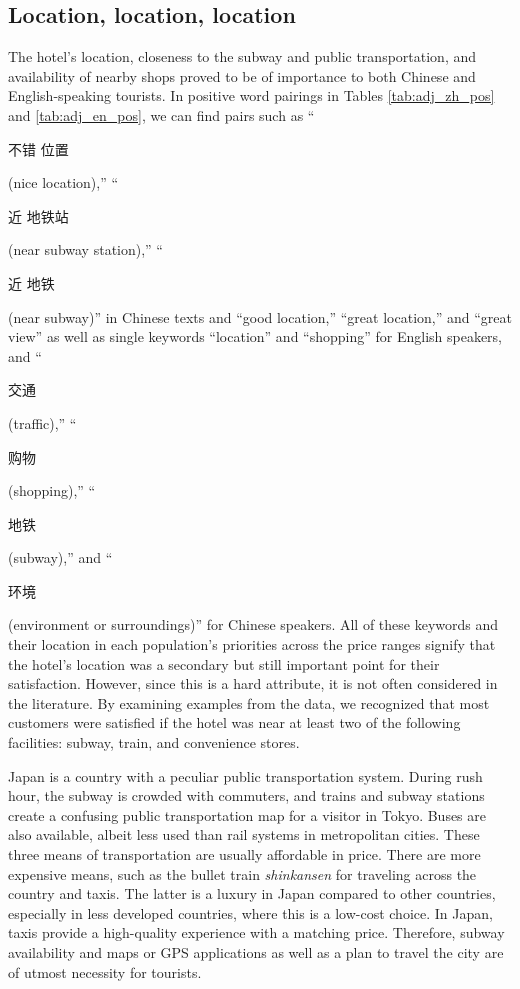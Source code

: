 \documentclass[smallextended,natbib]{svjour3}       %
\begin{document}
  \subsection{Location, location, location}\label{disc:location}

    The hotel's location, closeness to the subway and public transportation, and availability of nearby shops proved to be of importance to both Chinese and English-speaking tourists. In positive word pairings in Tables \ref{tab:adj_zh_pos} and \ref{tab:adj_en_pos}, we can find pairs such as ``\begin{CJK}{UTF8}{gbsn}不错 位置\end{CJK} (nice location),'' ``\begin{CJK}{UTF8}{gbsn}近 地铁站\end{CJK} (near subway station),'' ``\begin{CJK}{UTF8}{gbsn}近 地铁\end{CJK} (near subway)'' in Chinese texts and ``good location,'' ``great location,'' and ``great view'' as well as single keywords ``location'' and ``shopping'' for English speakers, and ``\begin{CJK}{UTF8}{gbsn}交通\end{CJK} (traffic),'' ``\begin{CJK}{UTF8}{gbsn}购物\end{CJK} (shopping),'' ``\begin{CJK}{UTF8}{gbsn}地铁\end{CJK} (subway),'' and ``\begin{CJK}{UTF8}{gbsn}环境\end{CJK} (environment or surroundings)'' for Chinese speakers. All of these keywords and their location in each population's priorities across the price ranges signify that the hotel's location was a secondary but still important point for their satisfaction. However, since this is a hard attribute, it is not often considered in the literature. By examining examples from the data, we recognized that most customers were satisfied if the hotel was near at least two of the following facilities: subway, train, and convenience stores. 

    Japan is a country with a peculiar public transportation system. During rush hour, the subway is crowded with commuters, and trains and subway stations create a confusing public transportation map for a visitor in Tokyo. Buses are also available, albeit less used than rail systems in metropolitan cities. These three means of transportation are usually affordable in price. There are more expensive means, such as the bullet train \textit{shinkansen} for traveling across the country and taxis. The latter is a luxury in Japan compared to other countries, especially in less developed countries, where this is a low-cost choice. In Japan, taxis provide a high-quality experience with a matching price. Therefore, subway availability and maps or GPS applications as well as a plan to travel the city are of utmost necessity for tourists. 
\end{document}
